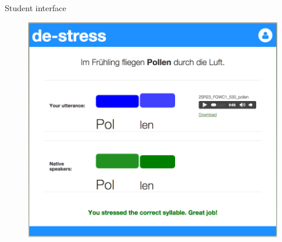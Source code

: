 \documentclass[xcolor={dvipsnames}]{beamer}
\begin{document}
		\begin{frame}{Student interface}
		\begin{figure}
		\includegraphics[height=.85\textheight]{../img/screenshots/StudentInterface-userIcon}
		\end{figure}
		\end{frame}
		
\end{document}
